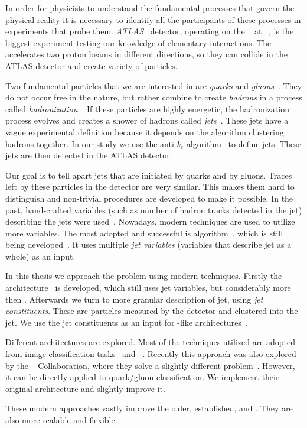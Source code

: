

In order for physicists to understand the fundamental processes that govern the physical reality it is necessary to identify all the participants of these processes in experiments that probe them. 
\emph{ATLAS}~\cite{ATLAS} detector, operating on the \lhc~\cite{lhc} at \cern~\cite{cern}, is the biggest experiment testing our knowledge of elementary interactions. 
The \lhc accelerates two proton beams in different directions, so they can collide in the ATLAS detector and create variety of particles.

Two fundamental particles that we are interested in are \emph{quarks} and \emph{gluons}~\cite{quarks}.
They do not occur free in the nature, but rather combine to create \emph{hadrons} in a process called \emph{hadronization}~\cite{hadronisation}.
If these particles are highly energetic, the hadronization process evolves and creates a shower of hadrons called \emph{jets}~\cite{jet}.
These jets have a vague experimental definition because it depends on the algorithm clustering hadrons together.
In our study we use the anti-$k_t$ algorithm~\cite{antikt} to define jets.
These jets are then detected in the ATLAS detector.

Our goal is to tell apart jets that are initiated by quarks and by gluons. 
Traces left by these particles in the detector are very similar.
This makes them hard to distinguish and non-trivial procedures are developed to make it possible.
In the past, hand-crafted variables (such as number of hadron tracks detected in the jet) describing the jets were used~\cite{ntrk_tag}.
Nowadays, modern \ml techniques are used to utilize more variables.
The most adopted and successful is \bdt algorithm~\cite{bdt}, which is still being developed~\cite{bdt_tag}.
It uses multiple \emph{jet variables} (variables that describe jet as a whole) as an input.

In this thesis we approach the problem using modern \dl techniques.
Firstly the \hgn architecture~\cite{highway} is developed, which still uses jet variables, but considerably more then \bdt. 
Afterwards we turn to more granular description of jet, using \emph{jet constituents}. 
These are particles measured by the detector and clustered into the jet. 
We use the jet constituents as an input for \trans-like architectures~\cite{att_is_all}.

Different architectures are explored.
Most of the techniques utilized are adopted from image classification tasks~\cite{deit3} and \nlp~\cite{bert}.
Recently this approach was also explored by the \cms~\cite{cms} Collaboration, where they solve a slightly different problem~\cite{part}.
However, it can be directly applied to quark/gluon classification.
We implement their original architecture and slightly improve it.

These modern approaches vastly improve the older, established, \bdt and \hgn.   
They are also more scalable and flexible.






